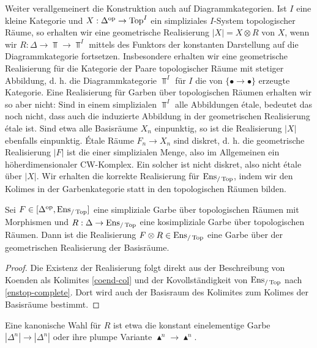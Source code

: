 Weiter verallgemeinert die Konstruktion auch auf
Diagrammkategorien. Ist $I$ eine kleine Kategorie und $X: \Delta^\mathrm{op}
\to \operatorname{Top}^I$ ein simpliziales $I$-System topologischer Räume, so
erhalten wir eine geometrische Realisierung $|X| = X \otimes R$ von
$X$, wenn wir $R: \Delta \to \Top \to \Top^I$ mittels des Funktors der
konstanten Darstellung auf die Diagrammkategorie
fortsetzen. Insbesondere erhalten wir eine geometrische Realisierung
für die Kategorie der Paare topologischer Räume mit stetiger
Abbildung, d. h. die Diagrammkategorie $\Top^I$ für $I$ die von $\{
\bullet \to \bullet \}$ erzeugte Kategorie. Eine Realisierung für
Garben über topologischen Räumen erhalten wir so aber nicht: Sind in
einem simplizialen $\Top^I$ alle Abbildungen étale, bedeutet das noch
nicht, dass auch die induzierte Abbildung in der geometrischen
Realisierung étale ist. Sind etwa alle Basisräume $X_n$ einpunktig, so
ist die Realisierung $|X|$ ebenfalls einpunktig. Étale Räume $F_n \to
X_n$ sind diskret, d. h. die geometrische Realisierung $|F|$ ist die
einer simplizialen Menge, also im Allgemeinen ein höherdimensionaler
CW-Komplex. Ein solcher ist nicht diskret, also nicht étale über
$|X|$. Wir erhalten die korrekte Realisierung für $\operatorname{Ens}_{/\operatorname{Top}}$,
indem wir den Kolimes in der Garbenkategorie statt in den
topologischen Räumen bilden.
\begin{prop}
  Sei $F \in [\Delta^\mathrm{op}, \operatorname{Ens}_{/\operatorname{Top}}]$ eine simpliziale Garbe über
  topologischen Räumen mit Morphismen und $R: \Delta \to \operatorname{Ens}_{/\operatorname{Top}}$
  eine kosimpliziale Garbe über topologischen Räumen. Dann ist die
  Realisierung $F \otimes R \in \operatorname{Ens}_{/\operatorname{Top}}$ eine Garbe über der
  geometrischen Realisierung der Basisräume.
\end{prop}
\begin{proof} \label{real-enstop}
  Die Existenz der Realisierung folgt direkt aus der Beschreibung von
  Koenden als Kolimites \ref{coend-col} und der Kovollständigkeit von
  $\operatorname{Ens}_{/\operatorname{Top}}$ nach \ref{enstop-complete}. Dort wird auch der
  Basisraum des Kolimites zum Kolimes der Basisräume bestimmt.
\end{proof}
\begin{bem}
  Eine kanonische Wahl für $R$ ist etwa die konstant einelementige
  Garbe $|\Delta^n| \to |\Delta^n|$ oder ihre plumpe Variante
  $\blacktriangle^n \to \blacktriangle^n$.
\end{bem}
